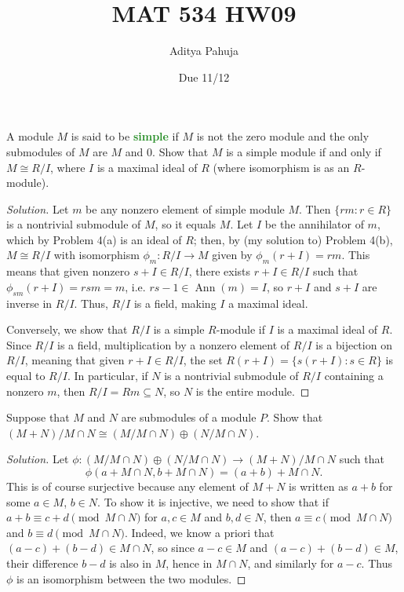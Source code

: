 \documentclass[10pt]{article}
\title{MAT 534 HW09}
\author{\large Aditya Pahuja}
\date{\large Due 11/12}
\providecommand{\quiv}{\equiv}
\newenvironment{soln}{\begin{proof}[Solution]}{\end{proof}}
\providecommand{\ann}{\operatorname{Ann}}
\providecommand{\vocab}[1]{{\textbf{\textcolor{ForestGreen}{#1}}}}
\begin{document}
\maketitle

\begin{problem}
    A module $M$ is said to be \vocab{simple} if
    $M$ is not the zero module and the only submodules of $M$
    are $M$ and $0$. Show that $M$ is a simple module
    if and only if $M\cong R/I$, where $I$ is a maximal ideal of $R$
    (where isomorphism is as an $R$-module).
\end{problem}

\begin{soln}
    Let $m$ be any nonzero element of simple module $M$. Then
    $\{rm : r\in R\}$ is a nontrivial submodule of $M$, so it equals $M$.
    Let $I$ be the annihilator of $m$, which by Problem 4(a) is an ideal of $R$;
    then, by (my solution to) Problem 4(b), $M\cong R/I$ with isomorphism
    $\phi_m\colon R/I\to M$ given by $\phi_m(r + I) = rm$.
    This means that given nonzero $s + I\in R/I$,
    there exists $r + I\in R/I$ such that
    $\phi_{sm}(r + I) = rsm = m$, i.e. $rs - 1\in\ann(m) = I$,
    so $r+I$ and $s+I$ are inverse in $R/I$.
    Thus, $R/I$ is a field, making $I$ a maximal ideal.

    Conversely, we show that $R/I$ is a simple $R$-module
    if $I$ is a maximal ideal of $R$.
    Since $R/I$ is a field, multiplication by
    a nonzero element of $R/I$ is a bijection on $R/I$,
    meaning that given $r+I\in R/I$, the set $R(r + I) = \{s(r + I) : s\in R\}$
    is equal to $R/I$. In particular, if $N$ is a nontrivial submodule
    of $R/I$ containing a nonzero $m$, then $R/I = Rm \subseteq N$,
    so $N$ is the entire module.
\end{soln}

\begin{problem}
    Suppose that $M$ and $N$ are submodules of a module $P$.
    Show that $(M+N)/M\cap N\cong (M/M\cap N)\oplus(N/M\cap N)$.
\end{problem}

\begin{soln}
    Let $\phi\colon (M/M\cap N)\oplus(N/M\cap N)\to (M+N)/M\cap N$
    such that
    \begin{equation*}
        \phi(a+M\cap N,b+M\cap N) = (a+b) + M\cap N.
    \end{equation*}
    This is of course surjective because any element of $M+N$
    is written as $a+b$ for some $a\in M$, $b\in N$.
    To show it is injective, we need to show that if
    $a+b\quiv c+d\pmod{M\cap N}$ for $a,c\in M$ and $b,d\in N$,
    then $a\quiv c\pmod{M\cap N}$ and $b\quiv d\pmod{M\cap N}$.
    Indeed, we know a priori that $(a-c) + (b-d) \in M\cap N$,
    so since $a-c\in M$ and $(a-c) + (b-d)\in M$,
    their difference $b-d$ is also in $M$, hence in $M\cap N$,
    and similarly for $a-c$.
    Thus $\phi$ is an isomorphism between the two modules.
\end{soln}
\end{document}
